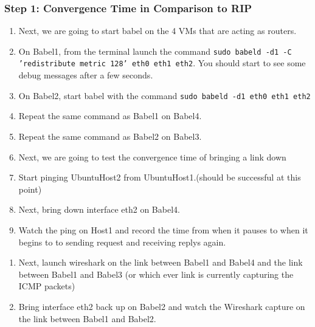 \documentclass[main.tex]{subfiles}
\begin{document}
\begin{itemize}
\subsubsection{Step 1: Convergence Time in Comparison to RIP } 
\begin{enumerate}[noitemsep,label=$\bullet$,leftmargin=20mm,labelsep=0.5cm]
\item Next, we are going to start babel on the 4 VMs that are acting as routers.
\item  On Babel1, from the terminal launch the command \texttt{sudo babeld -d1 -C 'redistribute metric 128' eth0 eth1 eth2}.  You should start to see some debug messages after a few seconds.
\item On Babel2, start babel with the command \texttt{sudo babeld -d1 eth0 eth1 eth2}
\item Repeat the same command as Babel1 on Babel4.
\item Repeat the same command as Babel2 on Babel3.
\item Next, we are going to test the convergence time of bringing a link down
\item Start pinging UbuntuHost2 from UbuntuHost1.(should be successful at this point)
\item Next, bring down interface eth2 on Babel4.
\item Watch the ping on Host1 and record the time from when it pauses to when it begins to to sending request and receiving replys again.
\end{enumerate}
\begin{enumerate}[noitemsep,label=$\bullet$,leftmargin=20mm,labelsep=0.5cm]
\item Next, launch wireshark on the link between Babel1 and Babel4 and the link between Babel1 and Babel3 (or which ever link is currently capturing the ICMP packets)
\item Bring interface eth2 back up on Babel2 and watch the Wireshark capture on the link between Babel1 and Babel2.
\end{enumerate}



\end{itemize}
\end{document}
